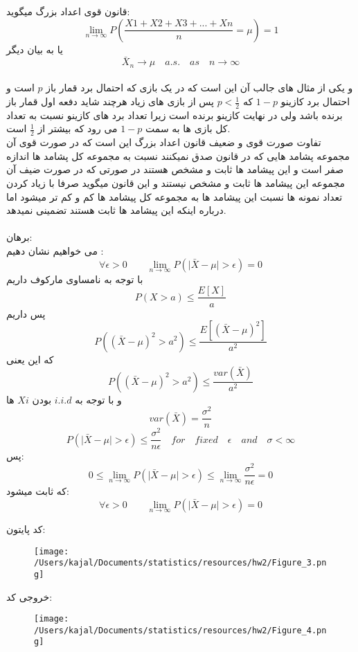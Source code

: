 \problem{}
\subproblem{}
قانون قوی اعداد بزرگ میگوید:\\
\[ \lim_{n \to \infty} P(\frac{X1+X2+X3+...+Xn}{n} = \mu) = 1\]
یا به بیان دیگر 
\[ \bar{X}_n \to \mu \quad a.s. \quad as \quad n\to\infty \]
\\
و یکی از مثال های جالب آن این است که در یک بازی که احتمال برد قمار باز $p$ است و احتمال برد کازینو \(1-p\) که $p<\frac{1}{2}$
پس از بازی های زیاد هرچند شاید دفعه اول قمار باز برنده باشد ولی در نهایت کازینو برنده است زیرا تعداد برد های کازینو نسبت به تعداد کل بازی ها به سمت \(1-p\) می رود که
بیشتر از $\frac{1}{2}$ است.\\

\subproblem{}
تفاوت صورت قوی و ضعیف قانون اعداد بزرگ این است که در صورت قوی آن مجموعه پشامد هایی
که در قانون صدق نمیکنند نسبت به مجموعه کل پشامد ها اندازه صفر است و این پیشامد ها ثابت و مشخص هستند
در صورتی که در صورت ضیف آن مجموعه این پیشامد ها ثابت و مشخص نیستند و این قانون میگوید صرفا با زیاد کردن تعداد
نمونه ها نسبت این پیشامد ها به مجموعه کل پیشامد ها کم و کم تر میشود اما درباره اینکه این پیشامد ها 
ثابت هستند تضمینی نمیدهد.\\\\
برهان:\\
می خواهیم نشان دهیم :\\ 
\[ \forall \epsilon >0 \quad \quad \lim_{{n \to \infty}} P(\lvert \bar{X} - \mu \rvert > \epsilon) = 0 \]
با توجه به نامساوی مارکوف داریم\\
\[P(X>a)\leq \frac{E[X]}{a} \] 
پس داریم
\[P((\bar{X} - \mu)^2>a^2)\leq\frac{E[( \bar{X} - \mu)^2]}{a^2} \] 
که این یعنی
\[P((\bar{X} - \mu)^2>a^2)\leq \frac{var(\bar{X})}{a^2} \] 
و با توجه به $i.i.d$ بودن $Xi$ ها 
\[var(\bar{X}) = \frac{\sigma^2}{n}\]
\[ P(\lvert \bar{X} - \mu \rvert > \epsilon ) \leq \frac{\sigma^2}{n\epsilon} \quad for \quad fixed \quad \epsilon \quad and \quad  \sigma<\infty\] 
پس:
\[0 \leq \lim_{{n \to \infty}} P(\lvert \bar{X} - \mu \rvert > \epsilon) \leq \lim_{{n \to \infty}} \frac{\sigma^2}{n\epsilon} = 0 \]
که ثابت میشود:
\[ \forall \epsilon >0 \quad \quad \lim_{{n \to \infty}} P(\lvert \bar{X} - \mu \rvert > \epsilon) = 0 \]

\subproblem{}
کد پایتون:\\
\begin{figure}[H]
	\centering
	\texttt{[image: /Users/kajal/Documents/statistics/resources/hw2/Figure\_3.png]}
\end{figure}

خروجی کد:
\begin{figure}[H]
	\centering
	\texttt{[image: /Users/kajal/Documents/statistics/resources/hw2/Figure\_4.png]}
\end{figure}
